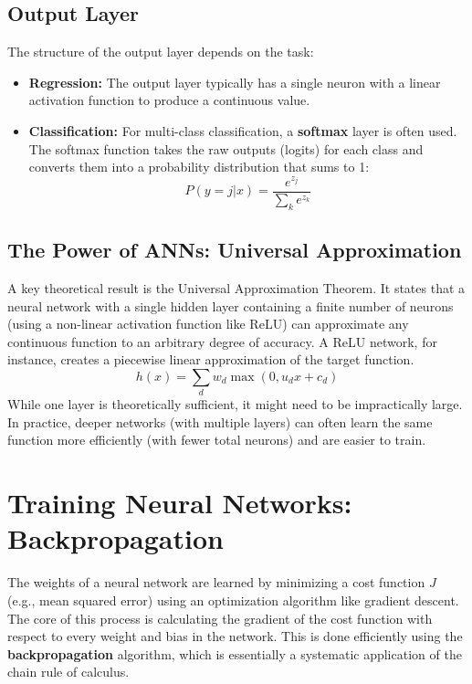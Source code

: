 \documentclass{article}
\begin{document}
\begin{multicols}{2}
	\subsection{Output Layer}
	The structure of the output layer depends on the task:
	\begin{itemize}
		\item \textbf{Regression:} The output layer typically has a single neuron with a linear activation function to produce a continuous value.
		\item \textbf{Classification:} For multi-class classification, a \textbf{softmax} layer is often used. The softmax function takes the raw outputs (logits) for each class and converts them into a probability distribution that sums to 1:
		      $$ P(y=j|x) = \frac{e^{z_j}}{\sum_{k} e^{z_k}} $$
	\end{itemize}

	\subsection{The Power of ANNs: Universal Approximation}
	A key theoretical result is the Universal Approximation Theorem. It states that a neural network with a single hidden layer containing a finite number of neurons (using a non-linear activation function like ReLU) can approximate any continuous function to an arbitrary degree of accuracy. A ReLU network, for instance, creates a piecewise linear approximation of the target function.
	$$ h(x) = \sum_{d} w_d \max(0, u_d x + c_d) $$
	While one layer is theoretically sufficient, it might need to be impractically large. In practice, deeper networks (with multiple layers) can often learn the same function more efficiently (with fewer total neurons) and are easier to train.

	\section{Training Neural Networks: Backpropagation}
	The weights of a neural network are learned by minimizing a cost function $J$ (e.g., mean squared error) using an optimization algorithm like gradient descent. The core of this process is calculating the gradient of the cost function with respect to every weight and bias in the network. This is done efficiently using the \textbf{backpropagation} algorithm, which is essentially a systematic application of the chain rule of calculus.


\end{multicols}
\end{document}
